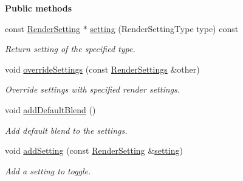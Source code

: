\begin{Indent}\textbf{ Public methods}\par
\begin{DoxyCompactItemize}
\item 
\mbox{\label{classrev_1_1_render_settings_a22de4ba13b017b1e527964a73f70d0ac}} 
const \mbox{\hyperlink{classrev_1_1_render_setting}{Render\+Setting}} $\ast$ \mbox{\hyperlink{classrev_1_1_render_settings_a22de4ba13b017b1e527964a73f70d0ac}{setting}} (Render\+Setting\+Type type) const
\begin{DoxyCompactList}\small\item\em Return setting of the specified type. \end{DoxyCompactList}\item 
\mbox{\label{classrev_1_1_render_settings_a1c3110980f91c25c55fd920b9dc80431}} 
void \mbox{\hyperlink{classrev_1_1_render_settings_a1c3110980f91c25c55fd920b9dc80431}{override\+Settings}} (const \mbox{\hyperlink{classrev_1_1_render_settings}{Render\+Settings}} \&other)
\begin{DoxyCompactList}\small\item\em Override settings with specified render settings. \end{DoxyCompactList}\item 
\mbox{\label{classrev_1_1_render_settings_a67827b17d1ef1fc60fb4bec634861d07}} 
void \mbox{\hyperlink{classrev_1_1_render_settings_a67827b17d1ef1fc60fb4bec634861d07}{add\+Default\+Blend}} ()
\begin{DoxyCompactList}\small\item\em Add default blend to the settings. \end{DoxyCompactList}\item 
\mbox{\label{classrev_1_1_render_settings_a8e21bf38ccbfe9dcc2d50971a83f5b11}} 
void \mbox{\hyperlink{classrev_1_1_render_settings_a8e21bf38ccbfe9dcc2d50971a83f5b11}{add\+Setting}} (const \mbox{\hyperlink{classrev_1_1_render_setting}{Render\+Setting}} \&\mbox{\hyperlink{classrev_1_1_render_settings_a22de4ba13b017b1e527964a73f70d0ac}{setting}})
\begin{DoxyCompactList}\small\item\em Add a setting to toggle. \end{DoxyCompactList}\item 

\end{DoxyCompactItemize}
\end{Indent}
